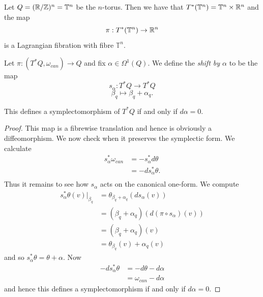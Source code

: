 \begin{eg}
    Let $Q= (\mathbb{R} / \mathbb{Z})^n = \mathbb{T}^n$ be the $n$-torus. Then we have that $T^*(\mathbb{T}^n) = \mathbb{T}^n \times \mathbb{R}^n$ and the map
    $$
        \pi : T^*(\mathbb{T}^n) \to \mathbb{R}^n
    $$
    is a Lagrangian fibration with fibre $\mathbb{T}^n$.
\end{eg}
\begin{definition} \label{def:shift-by-form}
    Let $\pi : (T^*Q, \omega_{can}) \to Q$ and fix $\alpha \in \Omega^1(Q)$. We define the \emph{shift by $\alpha$} to be the map
    $$ s_{\alpha}: T^*Q \to T^*Q$$
    $$ \beta_q \mapsto \beta_q + \alpha_q.$$
\end{definition}
\begin{prop} \label{prop:shift-by-closed}
    This defines a symplectomorphism of $T^*Q$ if and only if $d\alpha = 0$.
\end{prop}
\begin{proof}
    This map is a fibrewise translation and hence is obviously a diffeomorphism. We now check when it preserves
    the symplectic form. We calculate
    \begin{align*}
        s_{\alpha}^*\omega_{can} & = -s_{\alpha}^*d\theta   \\
                                 & = -ds_{\alpha}^* \theta. \\
    \end{align*}
    Thus it remains to see how $s_{\alpha}$ acts on the canonical one-form. We compute
    \begin{align*}
        s_{\alpha}^* \theta (v)|_{\beta_q} & = \theta_{\beta_q + \alpha_q}(ds_{\alpha}(v))     \\
                                           & = (\beta_q +\alpha_q)(d(\pi \circ s_{\alpha})(v)) \\
                                           & = (\beta_q +\alpha_q)(v)                          \\
                                           & = \theta_{\beta_q}(v) + \alpha_q(v)
    \end{align*}
    and so $s_{\alpha}^* \theta = \theta + \alpha$. Now
    \begin{align*}
        -ds_{\alpha}^* \theta & = -d\theta - d\alpha     \\
                              & = \omega_{can} - d\alpha
    \end{align*}
    and hence this defines a symplectomorphism if and only if $d\alpha = 0$.
\end{proof}


